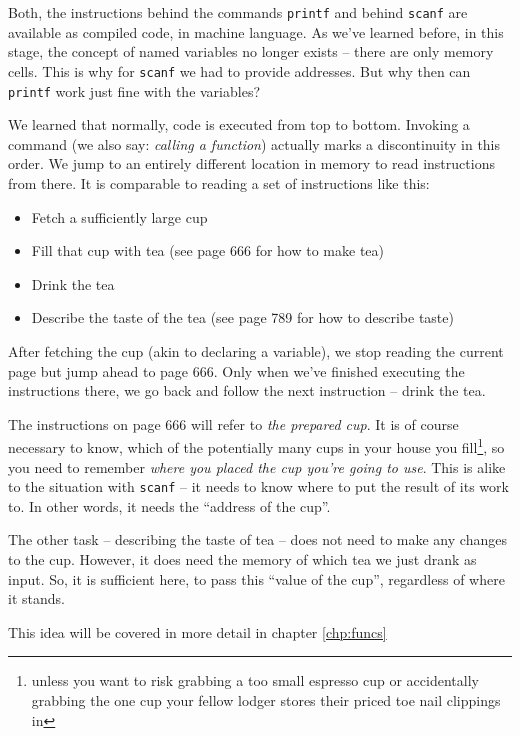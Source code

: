 \begin{plusbox}
Both, the instructions behind the commands \texttt{printf} and behind \texttt{scanf} are available as compiled code, \ie in machine language. As we've learned before, in this stage, the concept of named variables no longer exists -- there are only memory cells. This is why for \texttt{scanf} we had to provide addresses. But why then can \texttt{printf} work just fine with the variables?
\end{plusbox}
%
\begin{plusbox}[]
We learned that normally, code is executed from top to bottom. Invoking a command (we also say: \emph{calling a function}) actually marks a discontinuity in this order. We jump to an entirely different location in memory to read instructions from there. It is comparable to reading a set of instructions like this:
\begin{itemize}
\setlength\itemsep{0pt}
\item Fetch a sufficiently large cup
\item Fill that cup with tea (see page 666 for how to make tea)
\item Drink the tea
\item Describe the taste of the tea (see page 789 for how to describe taste)
\end{itemize}
After fetching the cup (akin to declaring a variable), we stop reading the current page but jump ahead to page 666. Only when we've finished executing the instructions there, we go back and follow the next instruction -- drink the tea.

The instructions on page 666 will refer to \emph{the prepared cup}. It is of course necessary to know, which of the potentially many cups in your house you fill\footnote{unless you want to risk grabbing a too small espresso cup or accidentally grabbing the one cup your fellow lodger stores their priced toe nail clippings in}, so you need to remember \emph{where you placed the cup you're going to use}. This is alike to the situation with \texttt{scanf} -- it needs to know where to put the result of its work to. In other words, it needs the \enquote{address of the cup}.

The other task -- describing the taste of tea -- does not need to make any changes to the cup. However, it does need the memory of which tea we just drank as input. So, it is sufficient here, to pass this \enquote{value of the cup}, regardless of where it stands.

This idea will be covered in more detail in chapter \ref{chp:funcs}
\end{plusbox}


